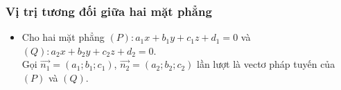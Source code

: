 \subsubsection{Vị trị tương đối giữa hai mặt phẳng}
\begin{itemize}
	\item [] Cho hai mặt phẳng $(P) \colon a_1x + b_1y + c_1z + d_1=0$ và $(Q) \colon a_2x + b_2y + c_2z + d_2=0$. \\
	Gọi $\vec{n_1}=(a_1;b_1;c_1)$, $\vec{n_2}=(a_2;b_2;c_2)$ lần lượt là vectơ pháp tuyến của $(P)$ và $(Q)$.\\
	\begin{boxdn}
	\end{boxdn}  
\end{itemize}

